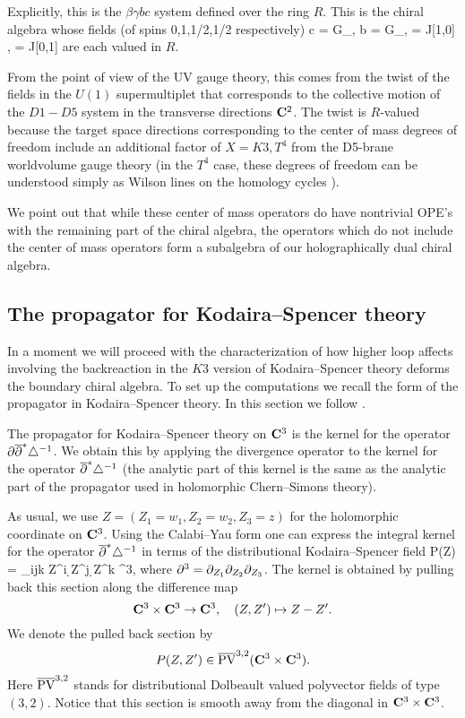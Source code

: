 \documentclass[../main.tex]{subfiles}
\begin{document}
Explicitly, this is the $\beta \gamma bc$ system defined over the ring $R$. 
This is the chiral algebra whose fields (of spins 0,1,1/2,1/2 respectively)
\beqn
c = \til G_\alpha[0,0], b = G_\gamma [0,0], \beta = J[1,0] , \gamma = J[0,1]
\eeqn
are each valued in $R$.

From the point of view of the UV gauge theory, this comes from the twist of the fields in the $U(1)$ supermultiplet that corresponds to the collective motion of the $D1-D5$ system in the transverse directions $\mathbf{C}^2$. The twist is $R$-valued because the target space directions corresponding to the center of mass degrees of freedom include an additional factor of $X =K3, T^4$ from the D5-brane worldvolume gauge theory (in the $T^4$ case, these degrees of freedom can be understood simply as Wilson lines on the homology cycles \cite{Davidetal}).

We point out that while these center of mass operators do have nontrivial OPE's with the remaining part of the chiral algebra, the operators which do not include the center of mass operators form a subalgebra of our holographically dual chiral algebra.

\subsection{The propagator for Kodaira--Spencer theory}

In a moment we will proceed with the characterization of how higher loop affects involving the backreaction in the $K3$ version of Kodaira--Spencer theory deforms the boundary chiral algebra.
To set up the computations we recall the form of the propagator in Kodaira--Spencer theory.
In this section we follow \cite{CLbcov1}.

The propagator for Kodaira--Spencer theory on $\mathbf{C}^3$ is the kernel for the operator $\partial \overline{\partial}^* \triangle^{-1}$. 
We obtain this by applying the divergence operator to the kernel for the operator $\overline{\partial}^* \triangle^{-1}$ (the analytic part of this kernel is the same as the analytic part of the propagator used in holomorphic Chern--Simons theory). 

As usual, we use $Z = (Z_1 = w_1, Z_2=w_2,Z_3=z)$ for the holomorphic coordinate on $\mathbf{C}^3$.
Using the Calabi--Yau form one can express the integral kernel for the operator $\overline{\partial}^* \triangle^{-1}$ in terms of the distributional Kodaira--Spencer field
\beqn
P(Z) =  \ep_{ijk} \br Z^{i} \d \br Z^j \d \br Z^k \del^3,
\eeqn
where $\partial^3 = \partial_{Z_1} \partial_{Z_2} \partial_{Z_3}$.
The kernel is obtained by pulling back this section along the difference map 
\[
\mathbf{C}^3 \times \mathbf{C}^3 \to \mathbf{C}^3,\quad (Z,Z') \mapsto Z - Z' .
\]
We denote the pulled back section by
\[
P(Z,Z') \in \overline{{\rm PV}}^{3,2}(\mathbf{C}^3 \times \mathbf{C}^3) . 
\]
Here $\overline{{\rm PV}}^{3,2}$ stands for distributional Dolbeault valued polyvector fields of type $(3,2)$.
Notice that this section is smooth away from the diagonal in $\mathbf{C}^3 \times \mathbf{C}^3$. 
\end{document}
